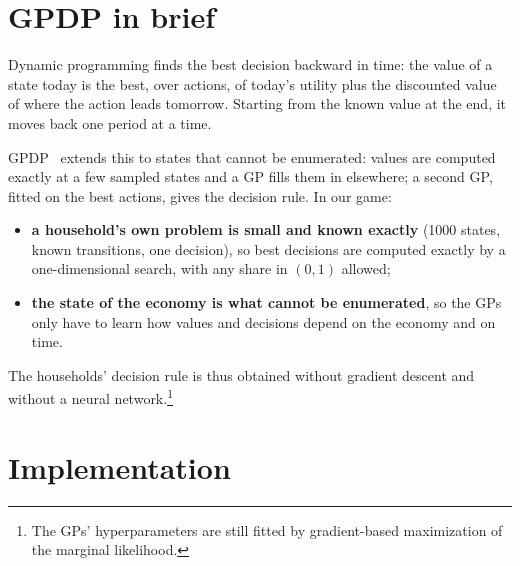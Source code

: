 \documentclass[11pt,a4paper]{article}
\begin{document}
\section{GPDP in brief}

Dynamic programming finds the best decision backward in time: the value of a state today is the best,
over actions, of today's utility plus the discounted value of where the action leads tomorrow.
Starting from the known value at the end, it moves back one period at a time.

GPDP~\cite{deisenroth} extends this to states that cannot be enumerated: values are computed exactly
at a few sampled states and a GP fills them in elsewhere; a second GP, fitted on the best actions,
gives the decision rule. In our game:
\begin{itemize}
\item \textbf{a household's own problem is small and known exactly} (1000 states, known transitions,
  one decision), so best decisions are computed exactly by a one-dimensional search, with any share
  in $(0,1)$ allowed;
\item \textbf{the state of the economy is what cannot be enumerated}, so the GPs only have to learn how
  values and decisions depend on the economy and on time.
\end{itemize}
The households' decision rule is thus obtained without gradient descent and without a neural
network.\footnote{The GPs' hyperparameters are still fitted by gradient-based maximization of the
marginal likelihood.}

\section{Implementation}\label{sec:impl}
\end{document}
